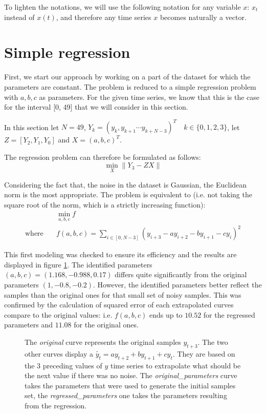 \documentclass[11pt]{article}
\begin{document}
    To lighten the notations, we will use the following notation for any variable $x$: $x_t$ instead of $x(t)$, and therefore any time series $x$ becomes naturally a vector.

\section{Simple regression}
    \label{section:regression}
    First, we start our approach by working on a part of the dataset for which the parameters are constant. The problem is reduced to a simple regression problem with $a, b, c$ as parameters. For the given time series, we know that this is the case for the interval [0, 49] that we will consider in this section.

    In this section let $N=49$, $Y_k = (y_k, y_{k+1} \cdots y_{k+N-3})^T \quad k \in \{0,1,2,3\}$, let $Z=[Y_2, Y_1, Y_0]$ and $X=(a, b, c)^T$.
    
    The regression problem can therefore be formulated as follows:
    $$ \min_{X}{\lVert Y_3 - ZX \rVert} $$

    Considering the fact that, the noise in the dataset is Gaussian, the Euclidean norm is the most appropriate. The problem is equivalent to (i.e. not taking the square root of the norm, which is a strictly increasing function):           
     \begin{equation*}
        \begin{aligned}
            & \min_{a,b,c}{f} \\
            \text{where} \quad &f(a,b,c) =  \sum_{i\in[0, N-3]}{(y_{i+3}  - a y_{i+2} - b  y_{i+1} - c y_i)^2}
        \end{aligned}
     \end{equation*}
                
    This first modeling was checked to ensure its efficiency and the results are displayed in figure \ref{fig:regression}. The identified parameters $(a, b, c) = (1.168, -0.988, 0.17)$ differs quite significantly from the original parameters $(1, -0.8, -0.2)$. However, the identified parameters better reflect the samples than the original ones for that small set of noisy samples. This was confirmed by the calculation of squared error of each extrapolated curves compare to the original values: i.e. $f(a,b,c)$ ends up to $10.52$ for the regressed parameters and $11.08$ for the original ones.

    \begin{figure}[h]
        \centering
        
        \caption{\label{fig:regression} The \emph{original} curve represents the original samples $y_{t+3}$. The two other curves display a $\tilde{y_t} = ay_{t+2} + by_{t+1}+cy_t$. They are based on the 3 preceding values of $y$ time series to extrapolate what should be the next value if there was no noise. The \emph{original\_parameters} curve takes the parameters that were used to generate the initial samples set, the \emph{regressed\_parameters} one takes the parameters resulting from the regression.}
    \end{figure}
    
\end{document}
